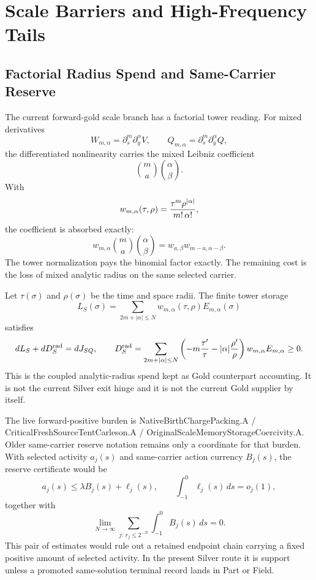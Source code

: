 \section{Scale Barriers and High-Frequency Tails}
\label{sec:scale-barrier-tail-branch}

\subsection{Factorial Radius Spend and Same-Carrier Reserve}
\label{subsec:factorial-radius-spend-same-carrier-reserve}

The current forward-gold scale branch has a factorial tower reading.  For mixed derivatives
\[
  W_{m,\alpha}=\partial_s^m\partial_y^\alpha V,
  \qquad
  Q_{m,\alpha}=\partial_s^m\partial_y^\alpha Q,
\]
the differentiated nonlinearity carries the mixed Leibniz coefficient
\[
  {m\choose a}{\alpha\choose\beta}.
\]
With
\[
  w_{m,\alpha}(\tau,\rho)={\tau^m\rho^{|\alpha|}\over m!\,\alpha!},
\]
the coefficient is absorbed exactly:
\[
  w_{m,\alpha}{m\choose a}{\alpha\choose\beta}
  =w_{a,\beta}w_{m-a,\alpha-\beta}.
\]
The tower normalization pays the binomial factor exactly.  The remaining cost is the loss of mixed analytic radius on the same selected carrier.

Let \(\tau(\sigma)\) and \(\rho(\sigma)\) be the time and space radii.  The finite tower storage
\[
  L_S(\sigma)=\sum_{2m+|\alpha|\le N}w_{m,\alpha}(\tau,\rho)E_{m,\alpha}(\sigma)
\]
satisfies
\[
  dL_S+dD_S^{\rm rad}=dJ_{SQ},
  \qquad
  D_S^{\rm rad}
  =\sum_{2m+|\alpha|\le N}
  \left(-m{\tau'\over\tau}-|\alpha|{\rho'\over\rho}\right)
  w_{m,\alpha}E_{m,\alpha}\ge0.
\]
This is the coupled analytic-radius spend kept as Gold counterpart accounting.
It is not the current Silver exit hinge and it is not the current Gold supplier
by itself.

The live forward-positive burden is NativeBirthChargePacking.A /
CriticalFreshSourceTentCarleson.A / OriginalScaleMemoryStorageCoercivity.A.
Older same-carrier reserve notation remains only a coordinate for that burden.
With selected activity \(a_j(s)\) and same-carrier action currency \(B_j(s)\),
the reserve certificate would be
\[
  a_j(s)\le \lambda B_j(s)+\ell_j(s),
  \qquad
  \int_{-1}^{0}\ell_j(s)\,ds=o_j(1),
\]
together with
\[
  \lim_{N\to\infty}
  \sum_{j:\,r_j\le2^{-N}}
  \int_{-1}^{0}B_j(s)\,ds=0.
\]
This pair of estimates would rule out a retained endpoint chain carrying a
fixed positive amount of selected activity.  In the present Silver route it is
support unless a promoted same-solution terminal record lands in Part or Field.

